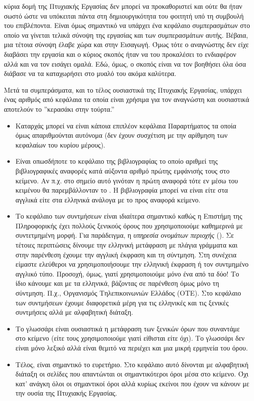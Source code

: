 κύρια δομή της Πτυχιακής Εργασίας δεν μπορεί 
να προκαθοριστεί και ούτε θα ήταν σωστό 
ώστε να υπόκειται πάντα στη δημιουργικότητα
του φοιτητή υπό τη συμβουλή του επιβλέποντα.
Είναι όμως σημαντικό να υπάρχει ένα κεφάλαιο συμπερασμάτων στο 
οποίο να γίνεται τελικά σύνοψη της εργασίας και των συμπερασμάτων αυτής.
Βέβαια, μια τέτοια σύνοψη έλαβε χώρα και στην Εισαγωγή. 
Όμως τότε ο αναγνώστης δεν είχε διαβάσει την εργασία και ο
κύριος σκοπός ήταν να του προκαλέσει το ενδιαφέρον αλλά και να 
τον εισάγει ομαλά. 
Εδώ, όμως, ο σκοπός είναι να τον βοηθήσει όλα όσα διάβασε να τα καταχωρήσει
στο μυαλό του ακόμα καλύτερα.



Μετά τα συμπεράσματα, και το τέλος ουσιαστικά της Πτυχιακής Εργασίας,
υπάρχει ένας αριθμός από κεφάλαια τα οποία είναι χρήσιμα για τον αναγνώστη
και ουσιαστικά αποτελούν το ''κερασάκι στην τούρτα.''

\begin{itemize}
\item
Καταρχάς μπορεί να είναι κάποια επιπλέον κεφάλαια Παραρτήματος τα
οποία όμως απαριθμούνται αυτόνομα (δεν έχουν συσχέτιση με την
αρίθμηση των κεφαλαίων του κυρίου μέρους).
\item
Είναι οπωσδήποτε το κεφάλαιο της βιβλιογραφίας το οποίο αριθμεί της 
βιβλιογραφικές αναφορές κατά αύξοντα αριθμό πρώτης εμφάνισής τους στο κείμενο.
Αν π.χ. στο σημείο αυτό γινόταν η πρώτη αναφορά τότε εν μέσω του κειμένου
θα παρεμβάλλονταν το \cite{example}.
Η βιβλιογραφία μπορεί να είναι είτε στα αγγλικά είτε στα ελληνικά
ανάλογα με το προς αναφορά κείμενο.
\item
Το κεφάλαιο των συντμήσεων είναι ιδιαίτερα σημαντικό καθώς η Επιστήμη
της Πληροφορικής έχει πολλούς ξενικούς όρους που χρησιμοποιούμε καθημερινά με συντετμημένη
μορφή. Για παράδειγμα, η \textit{υπηρεσία ονομάτων περιοχής} ().
Σε τέτοιες περιπτώσεις δίνουμε την ελληνική μετάφραση με πλάγια γράμματα και
στην παρένθεση έχουμε την αγγλική έκφραση και τη σύντμηση. Στη συνέχεια
είμαστε ελεύθεροι να χρησιμοποιήσουμε την ελληνική έκφραση ή τον συντμημένο 
αγγλικό τύπο. Προσοχή, όμως, γιατί χρησιμοποιούμε μόνο ένα από τα δύο! 
Το ίδιο κάνουμε και με τα ελληνικά, βάζοντας σε παρένθεση όμως μόνο τη
σύντμηση. Π.χ., Οργανισμός Τηλεπικοινωνιών Ελλάδος (ΟΤΕ). 
Στο κεφάλαιο των συντμήσεων έχουμε διαφορετικά μέρη για τις ελληνικές
και τις ξενικές συντμήσεις αλλά με αλφαβητική διάταξη.
\item
Το γλωσσάρι είναι ουσιαστικά η μετάφραση των ξενικών όρων
που συναντάμε στο κείμενο (είτε τους χρησιμοποιούμε γιατί
είθισται είτε όχι). Το γλωσσάρι δεν είναι μόνο λεξικό αλλά
είναι θεμιτό να περιέχει και μια μικρή ερμηνεία του όρου.
\item
Τέλος, είναι σημαντικό το ευρετήριο.   
Στο κεφάλαιο αυτό δίνονται με αλφαβητική διάταξη οι σελίδες που απαντώνται οι
σημαντικότεροι όροι μέσα στο κείμενο. Όχι κατ' ανάγκη όλοι οι σημαντικοί
όροι αλλά κυρίως εκείνοι που έχουν να κάνουν με την ουσία της Πτυχιακής Εργασίας.
\end{itemize} 



 
